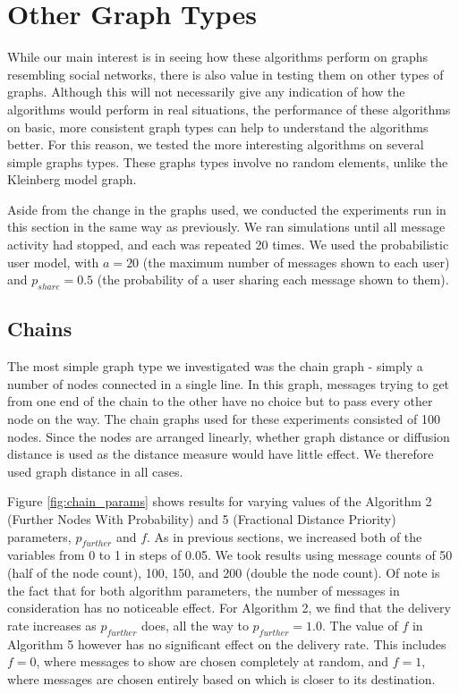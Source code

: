 \documentclass[bsc,frontabs,twoside,singlespacing,parskip,deptreport]{infthesis}     %
\begin{document}
\section{Other Graph Types} \label{sec:other_graph_types}

While our main interest is in seeing how these algorithms perform on graphs resembling social networks, there is also value in testing them on other types of graphs. Although this will not necessarily give any indication of how the algorithms would perform in real situations, the performance of these algorithms on basic, more consistent graph types can help to understand the algorithms better. For this reason, we tested the more interesting algorithms on several simple graphs types. These graphs types involve no random elements, unlike the Kleinberg model graph.

Aside from the change in the graphs used, we conducted the experiments run in this section in the same way as previously. We ran simulations until all message activity had stopped, and each was repeated 20 times. We used the probabilistic user model, with $a=20$ (the maximum number of messages shown to each user) and $p_{share}=0.5$ (the probability of a user sharing each message shown to them).

\subsection{Chains}
The most simple graph type we investigated was the chain graph - simply a number of nodes connected in a single line. In this graph, messages trying to get from one end of the chain to the other have no choice but to pass every other node on the way. The chain graphs used for these experiments consisted of 100 nodes. Since the nodes are arranged linearly, whether graph distance or diffusion distance is used as the distance measure would have little effect. We therefore used graph distance in all cases.

Figure \ref{fig:chain_params} shows results for varying values of the Algorithm 2 (Further Nodes With Probability) and 5 (Fractional Distance Priority) parameters, $p_{further}$ and $f$. As in previous sections, we increased both of the variables from 0 to 1 in steps of 0.05. We took results using message counts of 50 (half of the node count), 100, 150, and 200 (double the node count). Of note is the fact that for both algorithm parameters, the number of messages in consideration has no noticeable effect. For Algorithm 2, we find that the delivery rate increases as $p_{further}$ does, all the way to $p_{further}=1.0$. The value of $f$ in Algorithm 5 however has no significant effect on the delivery rate. This includes $f=0$, where messages to show are chosen completely at random, and $f=1$, where messages are chosen entirely based on which is closer to its destination.
\end{document}

